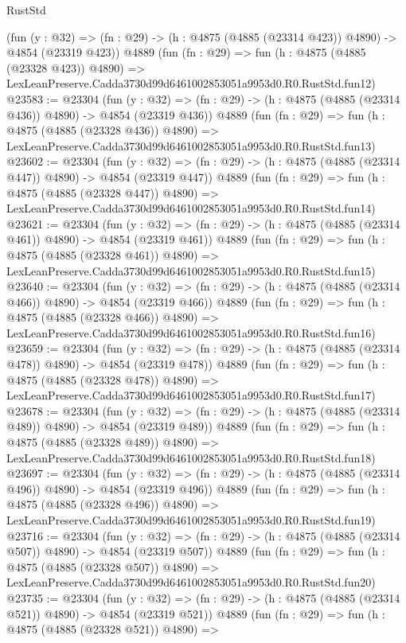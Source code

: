 \begin{lexlean}{RustStd}
\begin{coremodule}
    (fun (y : @32) => (fn : @29) -> (h : @4875 (@4885 (@23314 @423)) @4890) -> @4854 (@23319 @423))
    @4889
    (fun (fn : @29) =>
    fun (h : @4875 (@4885 (@23328 @423)) @4890) =>
    LexLeanPreserve.Cadda3730d99d6461002853051a9953d0.R0.RustStd.fun12)
@23583 := @23304
    (fun (y : @32) => (fn : @29) -> (h : @4875 (@4885 (@23314 @436)) @4890) -> @4854 (@23319 @436))
    @4889
    (fun (fn : @29) =>
    fun (h : @4875 (@4885 (@23328 @436)) @4890) =>
    LexLeanPreserve.Cadda3730d99d6461002853051a9953d0.R0.RustStd.fun13)
@23602 := @23304
    (fun (y : @32) => (fn : @29) -> (h : @4875 (@4885 (@23314 @447)) @4890) -> @4854 (@23319 @447))
    @4889
    (fun (fn : @29) =>
    fun (h : @4875 (@4885 (@23328 @447)) @4890) =>
    LexLeanPreserve.Cadda3730d99d6461002853051a9953d0.R0.RustStd.fun14)
@23621 := @23304
    (fun (y : @32) => (fn : @29) -> (h : @4875 (@4885 (@23314 @461)) @4890) -> @4854 (@23319 @461))
    @4889
    (fun (fn : @29) =>
    fun (h : @4875 (@4885 (@23328 @461)) @4890) =>
    LexLeanPreserve.Cadda3730d99d6461002853051a9953d0.R0.RustStd.fun15)
@23640 := @23304
    (fun (y : @32) => (fn : @29) -> (h : @4875 (@4885 (@23314 @466)) @4890) -> @4854 (@23319 @466))
    @4889
    (fun (fn : @29) =>
    fun (h : @4875 (@4885 (@23328 @466)) @4890) =>
    LexLeanPreserve.Cadda3730d99d6461002853051a9953d0.R0.RustStd.fun16)
@23659 := @23304
    (fun (y : @32) => (fn : @29) -> (h : @4875 (@4885 (@23314 @478)) @4890) -> @4854 (@23319 @478))
    @4889
    (fun (fn : @29) =>
    fun (h : @4875 (@4885 (@23328 @478)) @4890) =>
    LexLeanPreserve.Cadda3730d99d6461002853051a9953d0.R0.RustStd.fun17)
@23678 := @23304
    (fun (y : @32) => (fn : @29) -> (h : @4875 (@4885 (@23314 @489)) @4890) -> @4854 (@23319 @489))
    @4889
    (fun (fn : @29) =>
    fun (h : @4875 (@4885 (@23328 @489)) @4890) =>
    LexLeanPreserve.Cadda3730d99d6461002853051a9953d0.R0.RustStd.fun18)
@23697 := @23304
    (fun (y : @32) => (fn : @29) -> (h : @4875 (@4885 (@23314 @496)) @4890) -> @4854 (@23319 @496))
    @4889
    (fun (fn : @29) =>
    fun (h : @4875 (@4885 (@23328 @496)) @4890) =>
    LexLeanPreserve.Cadda3730d99d6461002853051a9953d0.R0.RustStd.fun19)
@23716 := @23304
    (fun (y : @32) => (fn : @29) -> (h : @4875 (@4885 (@23314 @507)) @4890) -> @4854 (@23319 @507))
    @4889
    (fun (fn : @29) =>
    fun (h : @4875 (@4885 (@23328 @507)) @4890) =>
    LexLeanPreserve.Cadda3730d99d6461002853051a9953d0.R0.RustStd.fun20)
@23735 := @23304
    (fun (y : @32) => (fn : @29) -> (h : @4875 (@4885 (@23314 @521)) @4890) -> @4854 (@23319 @521))
    @4889
    (fun (fn : @29) =>
    fun (h : @4875 (@4885 (@23328 @521)) @4890) =>

\end{coremodule}
\end{lexlean}

